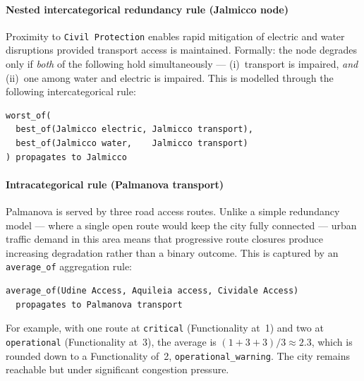 \documentclass[review,12pt]{elsarticle}
\begin{document}
\paragraph{Nested intercategorical redundancy rule (Jalmicco node)}
Proximity to \texttt{Civil Protection} enables rapid mitigation of electric
and water disruptions provided transport access is maintained.
Formally: the node degrades only if \emph{both} of the following hold
simultaneously — (i)~transport is impaired, \emph{and} (ii)~one among water
and electric is impaired.
This is modelled through the following intercategorical rule:
\begin{verbatim}
worst_of(
  best_of(Jalmicco electric, Jalmicco transport),
  best_of(Jalmicco water,    Jalmicco transport)
) propagates to Jalmicco
\end{verbatim}

\paragraph{Intracategorical rule (Palmanova transport)}
Palmanova is served by three road access routes.
Unlike a simple redundancy model — where a single open route would keep the
city fully connected — urban traffic demand in this area means that
progressive route closures produce increasing degradation rather than a binary
outcome.
This is captured by an \texttt{average\_of} aggregation rule:
\begin{verbatim}
average_of(Udine Access, Aquileia access, Cividale Access)
  propagates to Palmanova transport
\end{verbatim}
For example, with one route at \texttt{critical} (Functionality at~1) and two at
\texttt{operational} (Functionality at~3), the average is $(1+3+3)/3 \approx 2.3$, which is rounded down to a Functionality of~2, \texttt{operational\_warning}. The city remains reachable but under significant congestion pressure.
\end{document}
